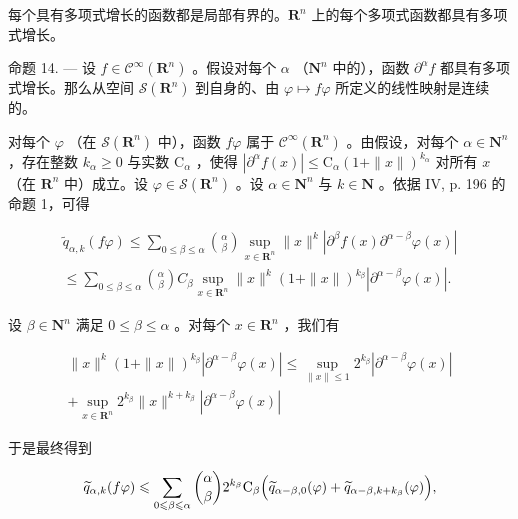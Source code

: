 每个具有多项式增长的函数都是局部有界的。\(\mathbf{R}^{n}\) 上的每个多项式函数都具有多项式增长。

命题 14. --- 设 \(f \in \mathcal{C}^{\infty}(\mathbf{R}^{n})\) 。假设对每个 \(\alpha\) （\(\mathbf{N}^{n}\) 中的），函数 \(\partial^{\alpha}f\) 都具有多项式增长。那么从空间 \(\mathcal{S}(\mathbf{R}^{n})\) 到自身的、由 \(\varphi \mapsto f\varphi\) 所定义的线性映射是连续的。

对每个 \(\varphi\) （在 \(\mathcal{S}(\mathbf{R}^{n})\) 中），函数 \(f\varphi\) 属于 \(\mathcal{C}^{\infty}(\mathbf{R}^{n})\) 。由假设，对每个 \(\alpha \in \mathbf{N}^{n}\) ，存在整数 \(k_{\alpha} \geqslant 0\) 与实数 \(\mathrm{C}_{\alpha}\) ，使得 \(|\partial^{\alpha}f(x)| \leqslant \mathrm{C}_{\alpha}(1 + \|x\|)^{k_{\alpha}}\) 对所有 \(x\) （在 \(\mathbf{R}^{n}\) 中）成立。设 \(\varphi \in \mathcal{S}(\mathbf{R}^{n})\) 。设 \(\alpha \in \mathbf{N}^{n}\) 与 \(k \in \mathbf{N}\) 。依据 IV, p. 196 的命题 1，可得

\[
\begin{array}{l} \widetilde {q} _ {\alpha , k} (f \varphi) \leqslant \sum_ {0 \leqslant \beta \leqslant \alpha} \binom {\alpha} {\beta} \sup _ {x \in \mathbf {R} ^ {n}} \| x \| ^ {k} | \partial^ {\beta} f (x)   \partial^ {\alpha - \beta} \varphi (x) | \\ \leqslant \sum_ {0 \leqslant \beta \leqslant \alpha} \binom {\alpha} {\beta} C _ {\beta} \sup _ {x \in \mathbf {R} ^ {n}} \| x \| ^ {k} (1 + \| x \|) ^ {k _ {\beta}} | \partial^ {\alpha - \beta} \varphi (x) |. \end{array}
\]

设 \(\beta \in \mathbf{N}^n\) 满足 \(0 \leqslant \beta \leqslant \alpha\) 。对每个 \(x \in \mathbf{R}^n\) ，我们有

\[
\begin{array}{c} \| x \| ^ {k} (1 + \| x \|) ^ {k _ {\beta}} | \partial^ {\alpha - \beta} \varphi (x) | \leqslant \sup _ {\| x \| \leqslant 1} 2 ^ {k _ {\beta}} | \partial^ {\alpha - \beta} \varphi (x) | \\ + \sup _ {x \in \mathbf {R} ^ {n}} 2 ^ {k _ {\beta}} \| x \| ^ {k + k _ {\beta}} | \partial^ {\alpha - \beta} \varphi (x) | \end{array}
\]

于是最终得到

\[
\widetilde {q} _ {\alpha , k} (f \varphi) \leqslant \sum_ {0 \leqslant \beta \leqslant \alpha} \binom {\alpha} {\beta} 2 ^ {k _ {\beta}} \mathrm{C} _ {\beta} \Bigl (\widetilde {q} _ {\alpha - \beta , 0} (\varphi) + \widetilde {q} _ {\alpha - \beta , k + k _ {\beta}} (\varphi) \Bigr),
\]

